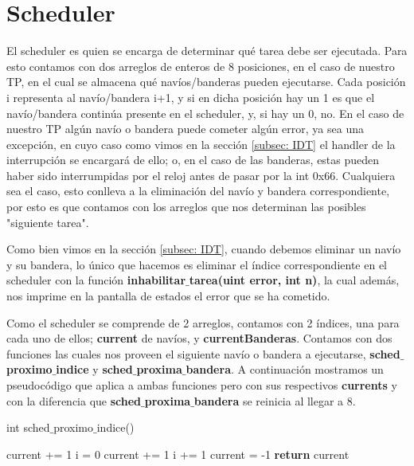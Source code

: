 \section{Scheduler}
\par{El scheduler es quien se encarga de determinar qué tarea debe ser ejecutada. Para esto contamos con dos arreglos de enteros de 8 posiciones, en el caso de nuestro TP, en el cual se almacena qué navíos/banderas pueden ejecutarse. Cada posición i representa al navío/bandera i+1, y si en dicha posición hay un 1 es que el navío/bandera continúa presente en el scheduler, y, si hay un 0, no. En el caso de nuestro TP algún navío o bandera puede cometer algún error, ya sea una excepción, en cuyo caso como vimos en la sección \ref{subsec: IDT} el handler de la interrupción se encargará de ello; o, en el caso de las banderas, estas pueden haber sido interrumpidas por el reloj antes de pasar por la int 0x66. Cualquiera sea el caso, esto conlleva a la eliminación del navío y bandera correspondiente, por esto es que contamos con los arreglos que nos determinan las posibles "siguiente tarea".}
\par{
Como bien vimos en la sección \ref{subsec: IDT}, cuando debemos eliminar un navío y su bandera, lo único que hacemos es eliminar el índice correspondiente en el scheduler con la función \textbf{inhabilitar$\_$tarea(uint error, int n)}, la cual además, nos imprime en la pantalla de estados el error que se ha cometido.
}
\par{Como el scheduler se comprende de 2 arreglos, contamos con 2 índices, una para cada uno de ellos; \textbf{current} de navíos, y \textbf{currentBanderas}. Contamos con dos funciones las cuales nos proveen el siguiente navío o bandera a ejecutarse, \textbf{sched$\_$proximo$\_$indice} y \textbf{sched$\_$proxima$\_$bandera}. A continuación mostramos un pseudocódigo que aplica a ambas funciones pero con sus respectivos \textbf{currents} y con la diferencia que \textbf{sched$\_$proxima$\_$bandera} se reinicia al llegar a 8.}

\begin{algorithm}[h!]
\caption{int sched$\_$proximo$\_$indice()}
\begin{algorithmic}
	\State current += 1
	\State i = 0
		\State current += 1
		\State i += 1
	\EndWhile
	\State current = -1
	\EndIf
	\State \textbf{return} current
\end{algorithmic}
\end{algorithm}

